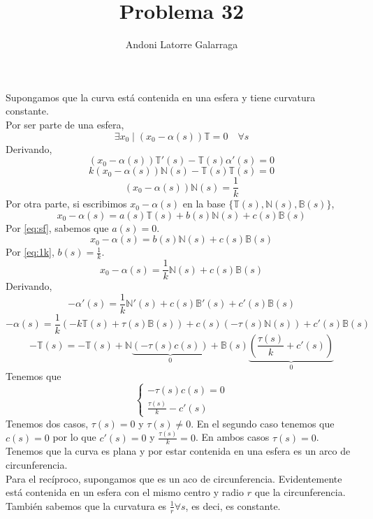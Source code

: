 \documentclass{article}
\title{Problema 32}
\author{Andoni Latorre Galarraga}
\date{}
\newcommand{\bb}[1]{\mathbb{#1}}
\begin{document}
\setlength{\parindent}{0cm}
\maketitle
Supongamos que la curva está contenida en una esfera y tiene curvatura constante.\\
Por ser parte de una esfera,
\begin{equation}\label{eq:sf}
\exists x_0 \mid (x_0-\alpha(s))\bb{T}=0 \quad \forall s
\end{equation}
Derivando,
$$
(x_0-\alpha(s))\bb{T}'(s)-\bb{T}(s)\alpha'(s)=0
$$
$$
k(x_0-\alpha(s))\bb{N}(s)-\bb{T}(s)\bb{T}(s)=0
$$
\begin{equation}\label{eq:1k}
(x_0-\alpha(s))\bb{N}(s)=\frac{1}{k}
\end{equation}
Por otra parte, si escribimos $x_0-\alpha(s)$ en la base $\{\bb{T}(s),\bb{N}(s),\bb{B}(s)\}$,
$$
x_0-\alpha(s)=a(s)\bb{T}(s)+b(s)\bb{N}(s)+c(s)\bb{B}(s)
$$
Por \eqref{eq:sf}, sabemos que $a(s)=0$.
$$
x_0-\alpha(s)=b(s)\bb{N}(s)+c(s)\bb{B}(s)
$$
Por \eqref{eq:1k}, $b(s)=\frac{1}{k}$.
$$
x_0-\alpha(s)=\frac{1}{k}\bb{N}(s)+c(s)\bb{B}(s)
$$
Derivando,
$$
-\alpha'(s)=\frac{1}{k}\bb{N}'(s)+c(s)\bb{B}'(s)+c'(s)\bb{B}(s)
$$
$$
-\alpha(s)=\frac{1}{k}(-k\bb{T}(s)+\tau(s)\bb{B}(s))+c(s)(-\tau(s)\bb{N}(s))+c'(s)\bb{B}(s)
$$
$$
-\bb{T}(s)=-\bb{T}(s)+\bb{N}\underbrace{(-\tau(s)c(s))}_0+\bb{B}(s)\underbrace{\left( \frac{\tau(s)}{k}+c'(s) \right)}_0
$$
Tenemos que
$$
\left\{
    \begin{array}{c}
        -\tau(s)c(s)=0 \\
        \frac{\tau(s)}{k}-c'(s)
    \end{array}\right.
$$
Tenemos dos casos, $\tau(s)=0$ y $\tau(s)\ne0$. En el segundo caso tenemos que $c(s)=0$ por lo que $c'(s)=0$ y $\frac{\tau(s)}{k}=0$. En ambos casos $\tau(s)=0$. Tenemos que la curva es plana y por estar contenida en una esfera es un arco de circunferencia.\\
Para el recíproco, supongamos que es un aco de circunferencia. Evidentemente está contenida en un esfera con el mismo centro y radio $r$ que la circunferencia. También sabemos que la curvatura es $\frac{1}{r}\forall s$, es deci, es constante.
\end{document}
